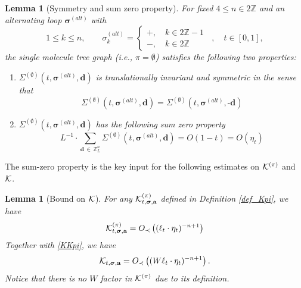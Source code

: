\documentclass[10pt,reqno]{article}
\theoremstyle{plain} %
\newtheorem{lemma}[theorem]{Lemma}
\theoremstyle{remark}
\numberwithin{equation}{section}
\begin{document}
\begin{lemma}[Symmetry and sum zero property]\label{lem:SZ}
For fixed $4 \le n\in 2\mathbb Z$ and an alternating  loop $\boldsymbol{\sigma}^{(alt)}$ with 
\begin{equation}\label{assum_SZ_SinMole}
1\le k\le n, \quad \quad {\sigma}^{(alt)}_k =\begin{cases}
    +, \quad k\in 2\mathbb Z-1
    \\\nonumber
    -, \quad k\in 2\mathbb Z 
\end{cases}\; \;,\quad t\in[0,1]  ,  
\end{equation}
 the single molecule tree graph (i.e., $\pi=\emptyset$) satisfies the following two properties: 
\begin{enumerate}
    \item $\Sigma^{(\emptyset)}(t, \boldsymbol{\sigma}^{(alt)}, \textbf{d}) $ is translationally invariant and 
    symmetric in the sense that 
\[
\Sigma^{(\emptyset)}(t, \boldsymbol{\sigma}^{(alt)}, \textbf{d})
= \Sigma^{(\emptyset)}(t, \boldsymbol{\sigma}^{(alt)}, \textbf{-d})
\]    

\item $\Sigma^{(\emptyset)}(t, \boldsymbol{\sigma}^{(alt)}, \textbf{d}) $ 
has the following sum zero property  
\begin{equation}\label{res_SZ_SinMole}
L^{-1} \cdot\sum_{\textbf{d}\,\in \,\mathbb Z^{n}_L } \Sigma^{(\emptyset)}(t, \boldsymbol{\sigma}^{(alt)}, \textbf{d}) = O(1-t)=O(\eta_t)
\end{equation}
\end{enumerate}
 
\end{lemma}
The sum-zero property is the key input for the  following estimates on $\cal K^{(\pi)}$ and $\cal K$. 
\begin{lemma}[Bound on ${\cal K}$]\label{ML:Kbound+pi}
For any ${\cal K}^{(\pi)}_{t, \boldsymbol{\sigma}, \textbf{a}}$ defined in Definition \ref{def_Kpi},   we have 
\begin{equation}\label{eq:bcal_k_pi}
  {\cal K}^{(\pi)}_{t, \boldsymbol{\sigma}, \textbf{a}} =O_\prec\left((\ell_t \cdot \eta_t)^{-n+1}\right)    
\end{equation}
Together with \eqref{KKpi}, 
we have  
\begin{equation}\label{eq:bcal_k_2}
  {\cal K}_{t, \boldsymbol{\sigma}, \textbf{a}} =O_\prec\left((W \ell_t \cdot \eta_t)^{-n+1}\right)    .
\end{equation}
Notice that there is no $W$ factor in ${\cal K}^{(\pi)}$ due to its definition.
\end{lemma}
\end{document}
